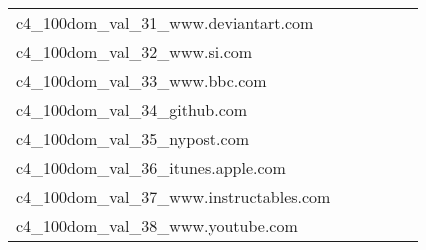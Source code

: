 {\begin{longtable}{m{6cm}m{1.7cm}m{1.7cm}m{1.7cm}m{1.7cm}m{1.7cm}}
	c4\_100dom\_val\_31\_www.deviantart.com  & \colorbox[HTML]{fefee0}{\makebox[\mywidth][c]{21.78}} & \colorbox[HTML]{e7f5ad}{\makebox[\mywidth][c]{21.05}} & \colorbox[HTML]{ffffe5}{\makebox[\mywidth][c]{22.78}} & \colorbox[HTML]{e0f2a8}{\makebox[\mywidth][c]{21.00}} & \colorbox[HTML]{77c578}{\makebox[\mywidth][c]{20.69}}\\
	c4\_100dom\_val\_32\_www.si.com  & \colorbox[HTML]{ffffe5}{\makebox[\mywidth][c]{11.49}} & \colorbox[HTML]{f1f9b4}{\makebox[\mywidth][c]{11.00}} & \colorbox[HTML]{ffffe5}{\makebox[\mywidth][c]{11.92}} & \colorbox[HTML]{d8efa2}{\makebox[\mywidth][c]{10.90}} & \colorbox[HTML]{77c578}{\makebox[\mywidth][c]{10.76}}\\
	c4\_100dom\_val\_33\_www.bbc.com  & \colorbox[HTML]{ffffe5}{\makebox[\mywidth][c]{9.35}} & \colorbox[HTML]{f9fcc6}{\makebox[\mywidth][c]{8.91}} & \colorbox[HTML]{ffffe5}{\makebox[\mywidth][c]{9.41}} & \colorbox[HTML]{def2a6}{\makebox[\mywidth][c]{8.80}} & \colorbox[HTML]{77c578}{\makebox[\mywidth][c]{8.70}}\\
	c4\_100dom\_val\_34\_github.com  & \colorbox[HTML]{e6f5ad}{\makebox[\mywidth][c]{11.57}} & \colorbox[HTML]{d7efa2}{\makebox[\mywidth][c]{11.49}} & \colorbox[HTML]{ffffe5}{\makebox[\mywidth][c]{12.94}} & \colorbox[HTML]{bae294}{\makebox[\mywidth][c]{11.40}} & \colorbox[HTML]{77c578}{\makebox[\mywidth][c]{11.28}}\\
	c4\_100dom\_val\_35\_nypost.com  & \colorbox[HTML]{fefee0}{\makebox[\mywidth][c]{14.31}} & \colorbox[HTML]{a5d98b}{\makebox[\mywidth][c]{13.41}} & \colorbox[HTML]{ffffe5}{\makebox[\mywidth][c]{15.29}} & \colorbox[HTML]{e1f3a9}{\makebox[\mywidth][c]{13.62}} & \colorbox[HTML]{77c578}{\makebox[\mywidth][c]{13.31}}\\
	c4\_100dom\_val\_36\_itunes.apple.com  & \colorbox[HTML]{fefee2}{\makebox[\mywidth][c]{16.49}} & \colorbox[HTML]{d9f0a3}{\makebox[\mywidth][c]{15.88}} & \colorbox[HTML]{ffffe5}{\makebox[\mywidth][c]{17.15}} & \colorbox[HTML]{eff8b3}{\makebox[\mywidth][c]{15.98}} & \colorbox[HTML]{77c578}{\makebox[\mywidth][c]{15.69}}\\
	c4\_100dom\_val\_37\_www.instructables.com  & \colorbox[HTML]{fdfedc}{\makebox[\mywidth][c]{16.75}} & \colorbox[HTML]{f0f9b4}{\makebox[\mywidth][c]{16.33}} & \colorbox[HTML]{ffffe5}{\makebox[\mywidth][c]{17.73}} & \colorbox[HTML]{e8f6ae}{\makebox[\mywidth][c]{16.28}} & \colorbox[HTML]{77c578}{\makebox[\mywidth][c]{15.97}}\\
	c4\_100dom\_val\_38\_www.youtube.com  & \colorbox[HTML]{fdfede}{\makebox[\mywidth][c]{8.42}} & \colorbox[HTML]{f2fab5}{\makebox[\mywidth][c]{8.24}} & \colorbox[HTML]{ffffe5}{\makebox[\mywidth][c]{8.83}} & \colorbox[HTML]{ebf7b0}{\makebox[\mywidth][c]{8.22}} & \colorbox[HTML]{77c578}{\makebox[\mywidth][c]{8.07}}\\

\end{longtable}}
